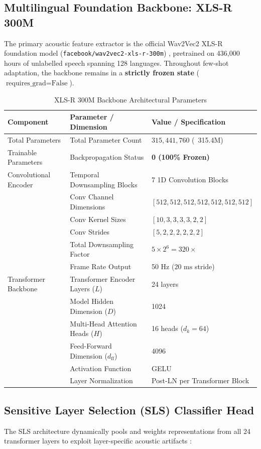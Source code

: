 \documentclass[11pt,a4paper]{article}
\begin{document}
\subsection{Multilingual Foundation Backbone: XLS-R 300M}
The primary acoustic feature extractor is the official Wav2Vec2 XLS-R foundation model (\texttt{facebook/wav2vec2-xls-r-300m}) \cite{babu2022xls}, pretrained on 436,000 hours of unlabelled speech spanning 128 languages. Throughout few-shot adaptation, the backbone remains in a \textbf{strictly frozen state} ($\text{requires\_grad} = \text{False}$).

\begin{table}[h!]
\centering
\small
\caption{XLS-R 300M Backbone Architectural Parameters}
\label{tab:backbone_params}
\begin{tabular}{lll}
\toprule
\textbf{Component} & \textbf{Parameter / Dimension} & \textbf{Value / Specification} \\
\midrule
Total Parameters & Total Parameter Count & $315,441,760$ (~315.4M) \\
Trainable Parameters & Backpropagation Status & \textbf{0 (100\% Frozen)} \\
Convolutional Encoder & Temporal Downsampling Blocks & 7 1D Convolution Blocks \\
& Conv Channel Dimensions & $[512, 512, 512, 512, 512, 512, 512]$ \\
& Conv Kernel Sizes & $[10, 3, 3, 3, 3, 2, 2]$ \\
& Conv Strides & $[5, 2, 2, 2, 2, 2, 2]$ \\
& Total Downsampling Factor & $5 \times 2^6 = 320\times$ \\
& Frame Rate Output & 50 Hz ($20\text{ ms}$ stride) \\
Transformer Backbone & Transformer Encoder Layers ($L$) & 24 layers \\
& Model Hidden Dimension ($D$) & 1024 \\
& Multi-Head Attention Heads ($H$) & 16 heads ($d_k = 64$) \\
& Feed-Forward Dimension ($d_{\text{ff}}$) & 4096 \\
& Activation Function & GELU \\
& Layer Normalization & Post-LN per Transformer Block \\
\bottomrule
\end{tabular}
\end{table}

\subsection{Sensitive Layer Selection (SLS) Classifier Head}
The SLS architecture dynamically pools and weights representations from all 24 transformer layers to exploit layer-specific acoustic artifacts \cite{zhang2024sensitive}:
\end{document}
